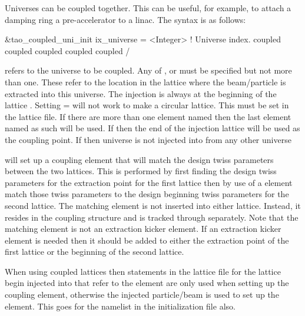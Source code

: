 {{{{Universes can be coupled together. This can be useful, for example, to attach a
damping ring a pre-accelerator to a linac. The syntax is as follows:
\begin{example}
  &tao_coupled_uni_init
    ix_universe             = <Integer>         ! Universe index.
    coupled%
    coupled%
    coupled%
    coupled%
    coupled%
  /
\end{example}
 refers to the universe to be coupled. Any of
,  or  must be specified but
not more than one. These refer to the location in the lattice where
the beam/particle is extracted into this universe.  The injection is
always at the beginning of the lattice . Setting
 =  will not work to make a circular
lattice. This must be set in the lattice file.  If there are more than
one element named  then the last element named as such
will be used. If  then the end of the injection
lattice will be used as the coupling point. If  then universe  is not injected into from any other universe

 will set up a coupling element that will match
the design twiss parameters between the two lattices. This is
performed by first finding the design twiss parameters for the
extraction point for the first lattice then by use of a \bmad
{} element match those twiss parameters to the design
beginning twiss parameters for the second lattice. The matching
element is not inserted into either lattice. Instead, it resides in
the \tao coupling structure and is tracked through separately. Note
that the matching element is not an extraction kicker element. If an
extraction kicker element is needed then it should be added to either
the extraction point of the first lattice or the beginning of the
second lattice.

When using coupled lattices then statements in the lattice file for
the lattice begin injected into that refer to the 
element are only used when setting up the coupling element, otherwise
the injected particle/beam is used to set up the 
element. This goes for the  namelist in the
initialization file also.

}}}}
